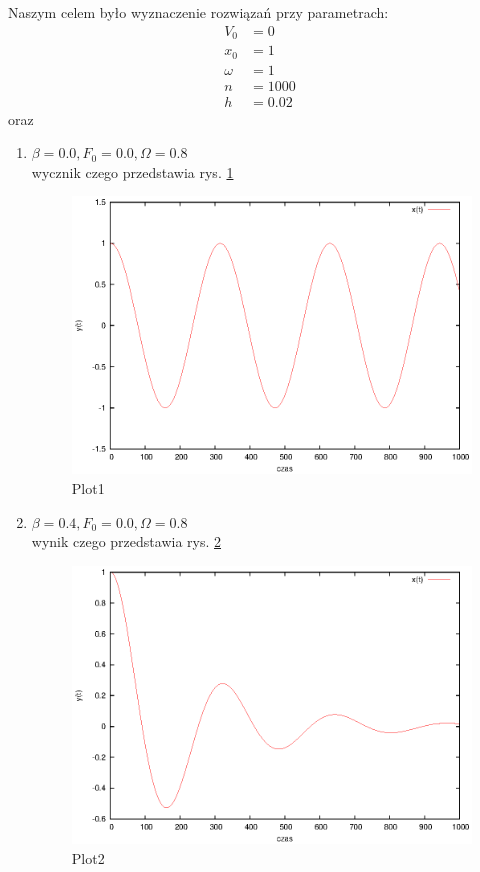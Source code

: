 \documentclass[12pt,a4paper]{article}
\begin{document}
\begin{enumerate}

Naszym celem było wyznaczenie rozwiązań przy parametrach:
\begin{align}
\nonumber V_0&=0\\
\nonumber x_0&=1\\
\nonumber \omega&=1\\
\nonumber n&=1000\\
\nonumber h&=0.02
\end{align}
oraz
\begin{enumerate}
\item $\beta=0.0, F_0=0.0, \Omega=0.8$\\
wycznik czego przedstawia rys. \ref{fig:plot1}
\begin{figure}
\caption{Plot1}
\label{fig:plot1}
\includegraphics{plot1.eps}
\end{figure}
\item $\beta=0.4, F_0=0.0, \Omega=0.8$\\
wynik czego przedstawia rys. \ref{fig:plot2}
\begin{figure}
\caption{Plot2}
\label{fig:plot2}
\includegraphics{plot2.eps}

\end{figure}
\end{enumerate}
\end{enumerate}
\end{document}
